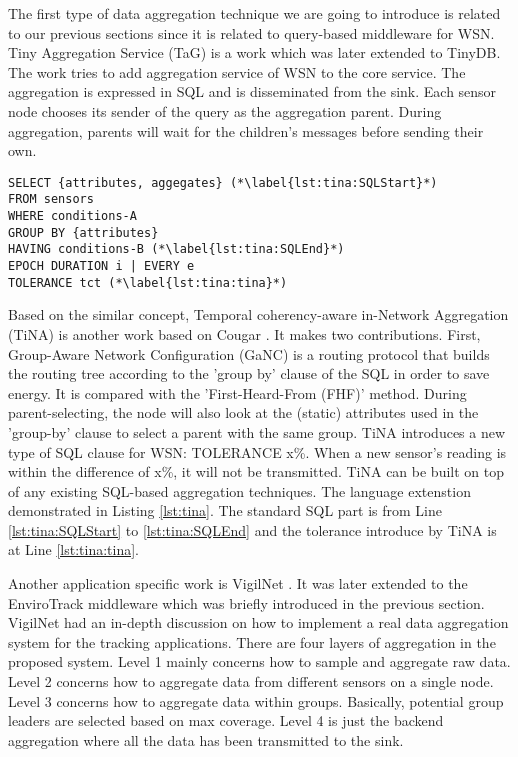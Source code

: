 The first type of data aggregation technique we are going to introduce is related to our previous sections since it is related to query-based middleware for WSN. Tiny Aggregation Service (TaG) \cite{tag} is a work which was later extended to TinyDB. The work tries to add aggregation service of WSN to the core service. The aggregation is expressed in SQL and is disseminated from the sink. Each sensor node chooses its sender of the query as the aggregation parent. During aggregation, parents will wait for the children's messages before sending their own.

\begin{lstlisting}[caption=An example of TiNA, float, label=lst:tina]
SELECT {attributes, aggegates} (*\label{lst:tina:SQLStart}*)
FROM sensors
WHERE conditions-A
GROUP BY {attributes}
HAVING conditions-B (*\label{lst:tina:SQLEnd}*)
EPOCH DURATION i | EVERY e
TOLERANCE tct (*\label{lst:tina:tina}*)
\end{lstlisting}

Based on the similar concept, Temporal coherency-aware in-Network Aggregation (TiNA) \cite{tina} is another work based on Cougar \cite{cougar}. It makes two contributions. First, Group-Aware Network Configuration (GaNC) is a routing protocol that builds the routing tree according to the 'group by' clause of the SQL in order to save energy. It is compared with the 'First-Heard-From (FHF)' method. During parent-selecting, the node will also look at the (static) attributes used in the 'group-by' clause to select a parent with the same group. TiNA introduces a new type of SQL clause for WSN: TOLERANCE x\%. When a new sensor's reading is within the difference of x\%, it will not be transmitted. TiNA can be built on top of any existing SQL-based aggregation techniques. The language extenstion demonstrated in Listing \ref{lst:tina}. The standard SQL part is from Line \ref{lst:tina:SQLStart} to \ref{lst:tina:SQLEnd} and the tolerance introduce by TiNA is at Line \ref{lst:tina:tina}.

Another application specific work is VigilNet \cite{vigilnet}. It was later extended to the EnviroTrack middleware \cite{envirotrack} which was briefly introduced in the previous section. VigilNet had an in-depth discussion on how to implement a real data aggregation system for the tracking applications. There are four layers of aggregation in the proposed system. Level 1 mainly concerns how to sample and aggregate raw data. Level 2 concerns how to aggregate data from different sensors on a single node. Level 3 concerns how to aggregate data within groups. Basically, potential group leaders are selected based on max coverage. Level 4 is just the backend aggregation where all the data has been transmitted to the sink.

